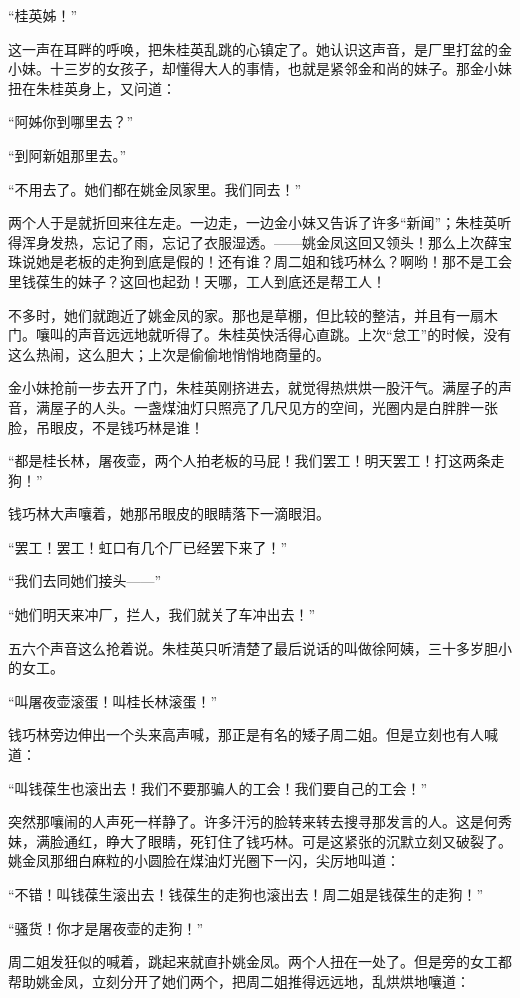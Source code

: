 \par “桂英姊！”
\par 这一声在耳畔的呼唤，把朱桂英乱跳的心镇定了。她认识这声音，是厂里打盆的金小妹。十三岁的女孩子，却懂得大人的事情，也就是紧邻金和尚的妹子。那金小妹扭在朱桂英身上，又问道：
\par “阿姊你到哪里去？”
\par “到阿新姐那里去。”
\par “不用去了。她们都在姚金凤家里。我们同去！”
\par 两个人于是就折回来往左走。一边走，一边金小妹又告诉了许多“新闻”；朱桂英听得浑身发热，忘记了雨，忘记了衣服湿透。——姚金凤这回又领头！那么上次薛宝珠说她是老板的走狗到底是假的！还有谁？周二姐和钱巧林么？啊哟！那不是工会里钱葆生的妹子？这回也起劲！天哪，工人到底还是帮工人！
\par 不多时，她们就跑近了姚金凤的家。那也是草棚，但比较的整洁，并且有一扇木门。嚷叫的声音远远地就听得了。朱桂英快活得心直跳。上次“怠工”的时候，没有这么热闹，这么胆大；上次是偷偷地悄悄地商量的。
\par 金小妹抢前一步去开了门，朱桂英刚挤进去，就觉得热烘烘一股汗气。满屋子的声音，满屋子的人头。一盏煤油灯只照亮了几尺见方的空间，光圈内是白胖胖一张脸，吊眼皮，不是钱巧林是谁！
\par “都是桂长林，屠夜壶，两个人拍老板的马屁！我们罢工！明天罢工！打这两条走狗！”
\par 钱巧林大声嚷着，她那吊眼皮的眼睛落下一滴眼泪。
\par “罢工！罢工！虹口有几个厂已经罢下来了！”
\par “我们去同她们接头——”
\par “她们明天来冲厂，拦人，我们就关了车冲出去！”
\par 五六个声音这么抢着说。朱桂英只听清楚了最后说话的叫做徐阿姨，三十多岁胆小的女工。
\par “叫屠夜壶滚蛋！叫桂长林滚蛋！”
\par 钱巧林旁边伸出一个头来高声喊，那正是有名的矮子周二姐。但是立刻也有人喊道：
\par “叫钱葆生也滚出去！我们不要那骗人的工会！我们要自己的工会！”
\par 突然那嚷闹的人声死一样静了。许多汗污的脸转来转去搜寻那发言的人。这是何秀妹，满脸通红，睁大了眼睛，死钉住了钱巧林。可是这紧张的沉默立刻又破裂了。姚金凤那细白麻粒的小圆脸在煤油灯光圈下一闪，尖厉地叫道：
\par “不错！叫钱葆生滚出去！钱葆生的走狗也滚出去！周二姐是钱葆生的走狗！”
\par “骚货！你才是屠夜壶的走狗！”
\par 周二姐发狂似的喊着，跳起来就直扑姚金凤。两个人扭在一处了。但是旁的女工都帮助姚金凤，立刻分开了她们两个，把周二姐推得远远地，乱烘烘地嚷道：
